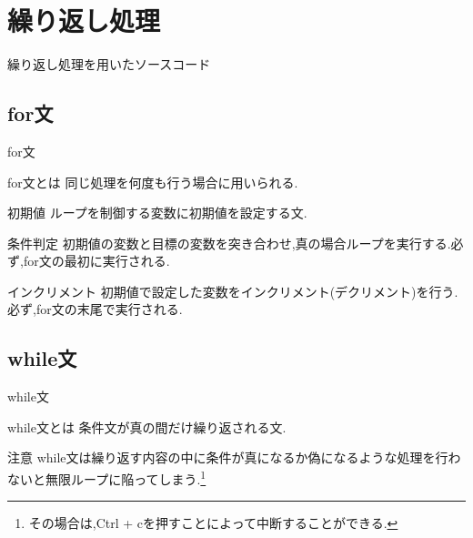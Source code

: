 \section{繰り返し処理}
\begin{frame}[fragile]{繰り返し処理を用いたソースコード}
    \begin{minipage}{\linewidth}
        
    \end{minipage}
\end{frame}
\subsection{for文}
\begin{frame}[fragile]{for文}
    \begin{block}{for文とは}
        同じ処理を何度も行う場合に用いられる.
    \end{block}
    
    \begin{block}{初期値}
        ループを制御する変数に初期値を設定する文.
    \end{block}
    \begin{block}{条件判定}
        初期値の変数と目標の変数を突き合わせ,真の場合ループを実行する.必ず,for文の最初に実行される.
    \end{block}
    \begin{block}{インクリメント}
        初期値で設定した変数をインクリメント(デクリメント)を行う.必ず,for文の末尾で実行される.
    \end{block}
\end{frame}

\subsection{while文}
\begin{frame}[fragile]{while文}
\begin{block}{while文とは}
    条件文が真の間だけ繰り返される文.
\end{block}

\begin{alertblock}{注意}
    while文は繰り返す内容の中に条件が真になるか偽になるような処理を行わないと無限ループに陥ってしまう.\footnote{その場合は,Ctrl + cを押すことによって中断することができる.}
\end{alertblock}
\end{frame}

